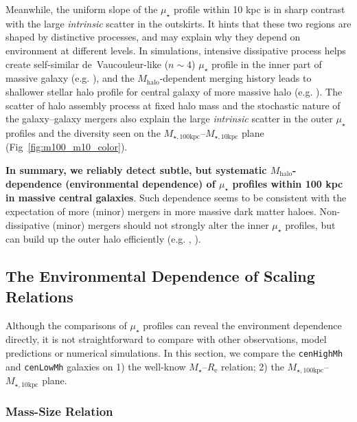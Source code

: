 \documentclass[a4paper,fleqn,usenatbib]{mnras}
\def\rbcg{\texttt{cenHighMh}}
\def\nbcg{\texttt{cenLowMh}}
\def\mstar{{$M_{\star}$}}
\def\mhalo{{$M_{\mathrm{halo}}$}}
\def\minn{{$M_{\star,10\mathrm{kpc}}$}}
\def\mtot{{$M_{\star,100\mathrm{kpc}}$}}
\def\mden{{$\mu_{\star}$}}
\begin{document}
    Meanwhile, the uniform slope of the \mden{} profile within 10 kpc is in sharp 
    contrast with the large \textit{intrinsic} scatter in the outskirts. 
    It hints that these two regions are shaped by distinctive processes, and may 
    explain why they depend on environment at different levels.  
    In simulations, intensive dissipative process helps create 
    self-similar de~Vaucouleur-like ($n{\sim} 4$) \mden{} profile in the inner part 
    of massive galaxy (e.g. \citealt{Hopkins2008}), and the \mhalo{}-dependent
    merging history leads to shallower stellar halo profile for central galaxy 
    of more massive halo (e.g. \citealt{Pillepich2014}). 
    The scatter of halo assembly process at fixed halo mass and the stochastic 
    nature of the galaxy--galaxy mergers also explain the large \textit{intrinsic} 
    scatter in the outer \mden{} profiles and the diversity seen on the 
    \mtot{}--\minn{} plane (Fig~\ref{fig:m100_m10_color}).

    \textbf{In summary, we reliably detect subtle, but systematic \mhalo{}-dependence 
    (environmental dependence) of \mden{} profiles within 100 kpc in massive central 
    galaxies}. 
    Such dependence seems to be consistent with the expectation of more (minor) 
    mergers in more massive dark matter haloes. 
    Non-dissipative (minor) mergers should not strongly alter the inner \mden{} 
    profiles, but can build up the outer halo efficiently
    (e.g. \citealt{Hilz2013}, \citealt{Oogi2013}).
      

\subsection{The Environmental Dependence of Scaling Relations}
    \label{ssec:scaling}
    
    Although the comparisons of \mden{} profiles can reveal the environment dependence 
    directly, it is not straightforward to compare with other observations, model 
    predictions or numerical simulations. 
    In this section, we compare the \rbcg{} and \nbcg{} galaxies on 
    1) the well-know \mstar{}--$R_{\mathrm{e}}$ relation; 
    2) the \mtot{}--\minn{} plane. 
    
\subsubsection{Mass-Size Relation}
    \label{sssec:mass_size}
    
\end{document}
